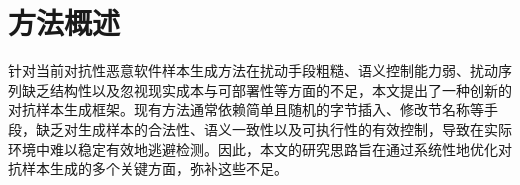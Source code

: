 










\section{方法概述}
针对当前对抗性恶意软件样本生成方法在扰动手段粗糙、语义控制能力弱、扰动序列缺乏结构性以及忽视现实成本与可部署性等方面的不足，本文提出了一种创新的对抗样本生成框架。现有方法通常依赖简单且随机的字节插入、修改节名称等手段，缺乏对生成样本的合法性、语义一致性以及可执行性的有效控制，导致在实际环境中难以稳定有效地逃避检测。因此，本文的研究思路旨在通过系统性地优化对抗样本生成的多个关键方面，弥补这些不足。

